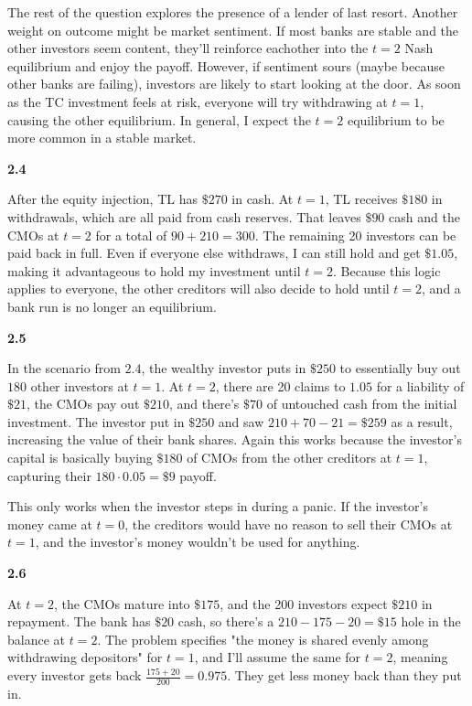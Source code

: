 \documentclass[11pt]{article}
\begin{document}
The rest of the question explores the presence of a lender of last resort. Another weight on outcome might be market sentiment. If most banks are stable and the other investors seem content, they'll reinforce eachother into the $t = 2$ Nash equilibrium and enjoy the payoff. However, if sentiment sours (maybe because other banks are failing), investors are likely to start looking at the door. As soon as the TC investment feels at risk, everyone will try withdrawing at $t = 1$, causing the other equilibrium. In general, I expect the $t = 2$ equilibrium to be more common in a stable market.

\textbf{2.4}

After the equity injection, TL has $\$270$ in cash. At $t = 1$, TL receives $\$180$ in withdrawals, which are all paid from cash reserves. That leaves $\$90$ cash and the CMOs at $t = 2$ for a total of $90 + 210 = 300$. The remaining 20 investors can be paid back in full. Even if everyone else withdraws, I can still hold and get $\$1.05$, making it advantageous to hold my investment until $t = 2$. Because this logic applies to everyone, the other creditors will also decide to hold until $t = 2$, and a bank run is no longer an equilibrium.

\textbf{2.5}

In the scenario from $2.4$, the wealthy investor puts in $\$250$ to essentially buy out $180$ other investors at $t = 1$. At $t = 2$, there are 20 claims to $1.05$ for a liability of $\$21$, the CMOs pay out $\$210$, and there's $\$70$ of untouched cash from the initial investment. The investor put in $\$250$ and saw $210 + 70 - 21 = \$259$ as a result, increasing the value of their bank shares. Again this works because the investor's capital is basically buying $\$180$ of CMOs from the other creditors at $t = 1$, capturing their $180 \cdot 0.05 = \$9$ payoff.  

This only works when the investor steps in during a panic. If the investor's money came at $t = 0$, the creditors would have no reason to sell their CMOs at $t = 1$, and the investor's money wouldn't be used for anything.

\textbf{2.6}

At $t = 2$, the CMOs mature into $\$175$, and the 200 investors expect $\$210$ in repayment. The bank has $\$20$ cash, so there's a $210 - 175 - 20 = \$15$ hole in the balance at $t = 2$. The problem specifies "the money is shared evenly among withdrawing depositors" for $t = 1$, and I'll assume the same for $t = 2$, meaning every investor gets back $\frac{175 + 20}{200} = 0.975$. They get less money back than they put in.
\end{document}
